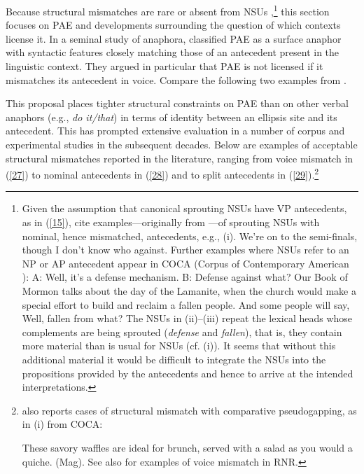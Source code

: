 Because structural mismatches are rare or absent from NSUs \citep[see][]{Merchant2005a, Merchant2013},\footnote{Given the assumption that canonical sprouting NSUs have VP antecedents, as in (\ref{15}), \citet[95]{Ginzburg2018} cite examples---originally from \citet[13]{Beecher2008}---of sprouting NSUs with nominal, hence mismatched, antecedents, e.g., (i).
	\ea We're on to the semi-finals, though I don't know who against.\z
%
	Further examples where NSUs refer to an NP or AP antecedent appear in COCA (Corpus of Contemporary American ):
%
	\ea  A: Well, it's a defense mechanism. B: Defense against what?\z
	\ea Our Book of Mormon talks about the day of the Lamanite, when the church would make a special effort to build and reclaim a fallen people. And some people will say, Well, fallen from what? \z
%
	The NSUs in (ii)--(iii) repeat the lexical heads whose complements are being sprouted (\textit{defense} and \textit{fallen}), that is, they contain more material than is usual for NSUs (cf. (i)). It seems that without this additional material it would be difficult to integrate the NSUs into the propositions provided by the antecedents and hence to arrive at the intended interpretations.} this section focuses on PAE and developments surrounding the question of which contexts license it. In a seminal study of anaphora, \citet{Hankamer1976} classified PAE as a surface anaphor with syntactic features closely matching those of an antecedent present in the linguistic context. They argued in particular that PAE is not licensed if it mismatches its antecedent in voice. Compare the following two examples from \citet[327]{Hankamer1976}.

\eal
{}
\zl
This proposal places tighter structural constraints on PAE than on other verbal anaphors (e.g., \textit{do it/that}) in terms of identity between an ellipsis site and its antecedent. This has prompted extensive evaluation in a number of corpus and experimental studies in the subsequent decades. Below are examples of acceptable structural mismatches reported in the literature, ranging from voice mismatch in (\ref{27}) to nominal antecedents in (\ref{28}) and to split antecedents in (\ref{29}).\footnote{\citet[87]{Miller2014} also reports cases of structural mismatch with  comparative pseudogapping, as in (i) from COCA:

\ea These savory waffles are ideal for brunch, served with a salad as you would a quiche. (Mag).\z
%
See also \citet{Abeille2016} for examples of voice mismatch in  RNR. 
}

